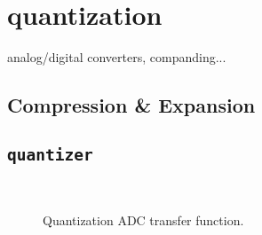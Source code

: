 % 
%

\newpage
\section{quantization}
\label{module:quantization}
analog/digital converters, companding...

\subsection{Compression \& Expansion}
\label{module:quantization:companding}


\subsection{{\tt quantizer}}
\label{module:quantization:quantizer}
%
\begin{figure}
\centering
\mbox{
   \quad
   \quad
}
\caption{Quantization ADC transfer function.}
\label{fig:module:quantization:adc}
\end{figure}
%


